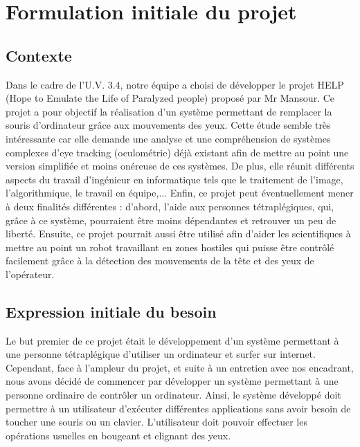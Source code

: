 \chapter{Formulation initiale du projet}



\section{Contexte}

Dans le cadre de l'U.V. 3.4, notre équipe a choisi de développer le projet HELP (Hope to Emulate the Life of Paralyzed people) proposé par Mr Mansour. Ce projet a pour objectif la réalisation d'un système permettant de remplacer la souris d’ordinateur grâce aux mouvements des yeux. Cette étude semble très intéressante car elle demande une analyse et une compréhension de systèmes complexes d'eye tracking (oculométrie) déjà existant afin de mettre au point une version simplifiée et moins onéreuse de ces systèmes. De plus, elle réunit différents aspects du travail d'ingénieur en informatique tels que le traitement de l'image, l'algorithmique, le travail en équipe,... Enfin, ce projet peut éventuellement mener à deux finalités différentes : d'abord, l'aide aux personnes tétraplégiques, qui, grâce à ce système, pourraient être moins dépendantes et retrouver un peu de liberté. Ensuite, ce projet pourrait aussi être utilisé afin d'aider les scientifiques à mettre au point un robot travaillant en zones hostiles qui puisse être contrôlé facilement grâce à la détection des mouvements de la tête et des yeux de l'opérateur.

\section{Expression initiale du besoin}

Le but premier de ce projet était le développement d'un système permettant à une personne tétraplégique d'utiliser un ordinateur et surfer sur internet. Cependant, face à l'ampleur du projet, et suite à un entretien avec nos encadrant, nous avons décidé de commencer par développer un système permettant à une personne ordinaire de contrôler un ordinateur. Ainsi, le système développé doit permettre à un utilisateur d'exécuter différentes applications sans avoir besoin de toucher une souris ou un clavier. L'utilisateur doit pouvoir effectuer les opérations usuelles en bougeant et clignant des yeux.
